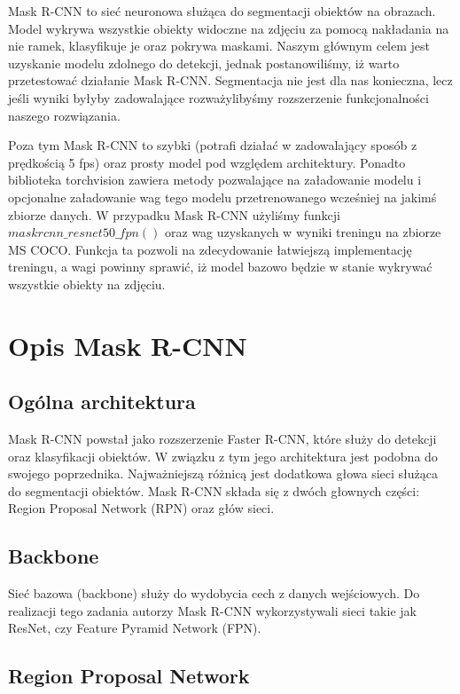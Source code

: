 \documentclass[licencjacka]{pracamgr}
\begin{document}
Mask R-CNN to sieć neuronowa służąca do segmentacji obiektów na obrazach. Model wykrywa wszystkie obiekty widoczne na zdjęciu za pomocą nakładania na nie ramek, klasyfikuje je oraz pokrywa maskami. Naszym głównym celem jest uzyskanie modelu zdolnego do detekcji, jednak postanowiliśmy, iż warto przetestować działanie Mask R-CNN. Segmentacja nie jest dla nas konieczna, lecz jeśli wyniki byłyby zadowalające rozważylibyśmy rozszerzenie funkcjonalności naszego rozwiązania.

Poza tym Mask R-CNN to szybki (potrafi działać w zadowalający sposób z prędkością 5 fps) oraz prosty model pod względem architektury. Ponadto biblioteka torchvision zawiera metody pozwalające na załadowanie modelu i opcjonalne załadowanie wag tego modelu przetrenowanego wcześniej na jakimś zbiorze danych. W przypadku Mask R-CNN użyliśmy funkcji $maskrcnn\_resnet50\_fpn()$ oraz wag uzyskanych w wyniki treningu na zbiorze MS COCO. Funkcja ta pozwoli na zdecydowanie łatwiejszą implementację treningu, a wagi powinny sprawić, iż model bazowo będzie w stanie wykrywać wszystkie obiekty na zdjęciu.

\section{Opis Mask R-CNN}

\subsection{Ogólna architektura}

Mask R-CNN powstał jako rozszerzenie Faster R-CNN, które służy do detekcji oraz klasyfikacji obiektów. W związku z tym jego architektura jest podobna do swojego poprzednika. Najważniejszą różnicą jest dodatkowa głowa sieci służąca do segmentacji obiektów. Mask R-CNN składa się z dwóch głownych części: Region Proposal Network (RPN) oraz głów sieci.

\subsection{Backbone}
Sieć bazowa (backbone) służy do wydobycia cech z danych wejściowych. Do realizacji tego zadania autorzy Mask R-CNN wykorzystywali sieci takie jak ResNet, czy Feature Pyramid Network (FPN).

\subsection{Region Proposal Network}
\end{document}
